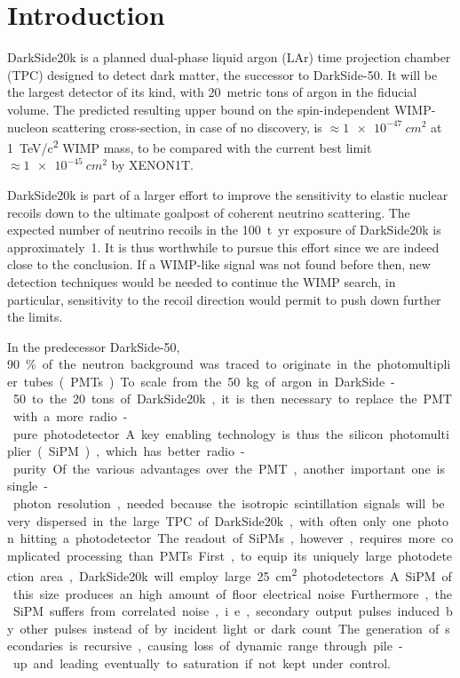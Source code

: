 \chapter*{Introduction}

DarkSide20k is a planned dual-phase liquid argon (LAr) time projection chamber
(TPC) designed to detect dark matter, the successor to DarkSide-50. It will be
the largest detector of its kind, with 20~metric tons of argon in the fiducial
volume. The predicted resulting upper bound on the spin-independent
WIMP-nucleon scattering cross-section, in case of no discovery, is
$\approx\SI{1e-47}{cm^2}$ at \SI{1}{TeV/c^2} WIMP mass, to be compared with the
current best limit $\approx\SI{1e-45}{cm^2}$ by XENON1T.

DarkSide20k is part of a larger effort to improve the sensitivity to elastic
nuclear recoils down to the ultimate goalpost of coherent neutrino scattering.
The expected number of neutrino recoils in the \SI{100}{t yr} exposure of
DarkSide20k is approximately~1. It is thus worthwhile to pursue this effort
since we are indeed close to the conclusion. If a WIMP-like signal was not
found before then, new detection techniques would be needed to continue the
WIMP search, in particular, sensitivity to the recoil direction would permit to
push down further the limits.

In the predecessor DarkSide-50, \SI{90}\% of the neutron background was traced
to originate in the photomultiplier tubes (PMTs). To scale from the \SI{50}{kg}
of argon in DarkSide-50 to the 20~tons of DarkSide20k, it is then necessary to
replace the PMT with a more radio-pure photodetector. A key enabling technology
is thus the silicon photomultiplier (SiPM), which has better radio-purity. Of
the various advantages over the PMT, another important one is single-photon
resolution, needed because the isotropic scintillation signals will be very
dispersed in the large TPC of DarkSide20k, with often only one photon hitting a
photodetector.

The readout of SiPMs, however, requires more complicated processing than PMTs.
First, to equip its uniquely large photodetection area, DarkSide20k will employ
large \SI{25}{cm^2} photodetectors. A SiPM of this size produces an high amount
of floor electrical noise. Furthermore, the SiPM suffers from correlated noise,
i.e., secondary output pulses induced by other pulses instead of by incident
light or dark count. The generation of secondaries is recursive, causing loss
of dynamic range through pile-up and leading eventually to saturation if not
kept under control.

